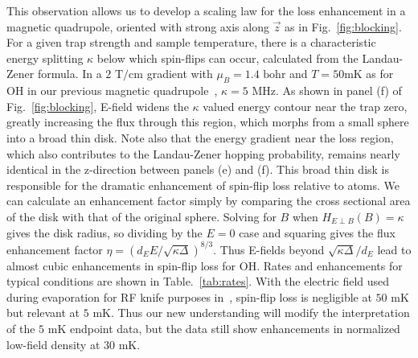 \documentclass[%
 reprint,
groupedaddress,
 amsmath,amssymb,
 aps,
prl,
]{revtex4-1}
\newcommand{\epbm}{{E\!\perp\!B}}
\begin{document}
This observation allows us to develop a scaling law for the loss enhancement in a magnetic quadrupole, oriented with strong axis along $\vec{z}$ as in Fig.~\ref{fig:blocking}. For a given trap strength and sample temperature, there is a characteristic energy splitting $\kappa$ below which spin-flips can occur, calculated from the Landau-Zener formula. In a $2\text{ T/cm}$ gradient with $\mu_B=\text{1.4 bohr}$ and $T=50 \text{mK}$ as for OH in our previous magnetic quadrupole~\cite{Sawyer2008}, $\kappa=5\text{ MHz}$. As shown in panel (f) of Fig.~\ref{fig:blocking}, E-field widens the $\kappa$ valued energy contour near the trap zero, greatly increasing the flux through this region, which morphs from a small sphere into a broad thin disk. Note also that the energy gradient near the loss region, which also contributes to the Landau-Zener hopping probability, remains nearly identical in the z-direction between panels (e) and (f). This broad thin disk is responsible for the dramatic enhancement of spin-flip loss relative to atoms. We can calculate an enhancement factor simply by comparing the cross sectional area of the disk with that of the original sphere. Solving for $B$ when $H_\epbm(B)=\kappa$ gives the disk radius, so dividing by the $E=0$ case and squaring gives the flux enhancement factor $\eta = (d_EE/\sqrt{\kappa\Delta})^{8/3}$. Thus E-fields beyond $\sqrt{\kappa\Delta}/d_E$ lead to almost cubic enhancements in spin-flip loss for OH. Rates and enhancements for typical conditions are shown in Table.~\ref{tab:rates}. With the electric field used during evaporation for RF knife purposes in~\cite{Stuhl2012evap}, spin-flip loss is negligible at $50\text{ mK}$ but relevant at $5\text{ mK}$. Thus our new understanding will modify the interpretation of the $5\text{ mK}$ endpoint data, but the data still show enhancements in normalized low-field density at $30\text{ mK}$.


\end{document}
